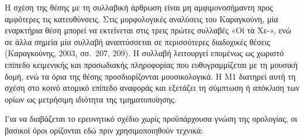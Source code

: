 \documentclass[11pt,a4paper]{article}
\begin{document}
Η σχέση της θέσης με τη συλλαβική άρθρωση είναι μη αμφιμονοσήμαντη προς αμφότερες τις κατευθύνσεις. Στις μορφολογικές αναλύσεις του Καραγκούνη, μία εναρκτήρια θέση μπορεί να εκτείνεται στις τρεις πρώτες συλλαβές «Οἱ τὰ Χε-», ενώ σε άλλα σημεία μία συλλαβή αναπτύσσεται σε περισσότερες διαδοχικές θέσεις (Καραγκούνης, 2003, σσ.~207, 209). Η συλλαβή λειτουργεί επομένως ως χωριστό επίπεδο κειμενικής και προσωδιακής πληροφορίας που ευθυγραμμίζεται με τη μουσική δομή, ενώ τα όρια της θέσης προσδιορίζονται μουσικολογικά. Η M1 διατηρεί αυτή τη σχέση στο κοινό ατομικό επίπεδο αναφοράς και εξετάζει τη σύμπτωση ή απόκλιση των ορίων ως μετρήσιμη ιδιότητα της τμηματοποίησης.

Για να διαβάζεται το ερευνητικό σχέδιο χωρίς προϋπάρχουσα γνώση της ορολογίας, οι βασικοί όροι ορίζονται εδώ πριν χρησιμοποιηθούν τεχνικά:
\end{document}
